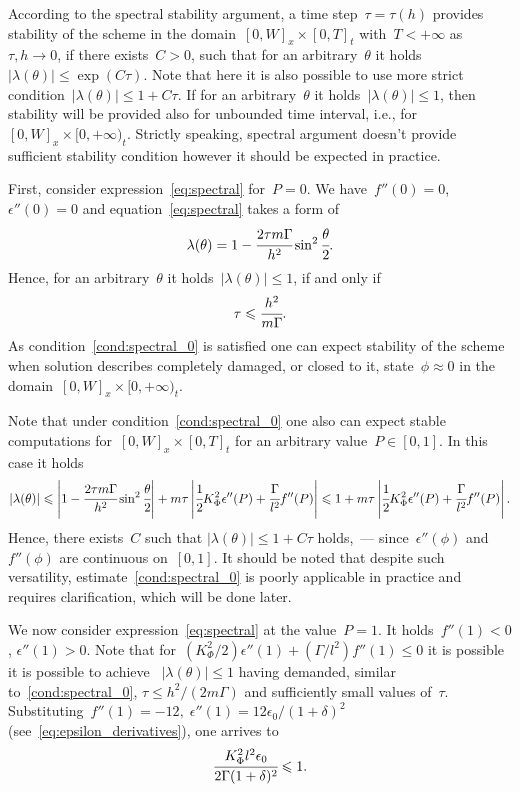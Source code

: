 According to the spectral stability argument, a time
step~$\tau = \tau(h)$ provides stability of the scheme in the
domain~$[0, W]_x \times [0, T]_t$ with~$T<+\infty$ as~$\tau, h \to 0$, if there
exists~$C > 0$, such that for an arbitrary~$\theta$ it
holds~$|\lambda(\theta)| \leqslant \exp(C\tau)$.  Note that here it is
also possible to use more strict condition~$|\lambda(\theta)| \leqslant 1 + C\tau$.
If for an arbitrary~$\theta$ it holds~$|\lambda(\theta)| \leqslant 1$,
then stability will be provided also for unbounded time interval, i.e.,
for~$[0, W]_x \times [0, +\infty)_t$.
Strictly speaking, spectral argument doesn't provide sufficient
stability condition however it should be expected in practice.

First, consider expression~\eqref{eq:spectral} for~$P=0$.
We have~$f''(0) = 0$, $\epsilon''(0) = 0$ and equation~\eqref{eq:spectral}
takes a form of
$$\lambda(\theta) = 1 - \cfrac{2 \tau m \Gamma}{h^2} \sin^2 \cfrac{\theta}{2} {\text{.}}$$
Hence, for an arbitrary~$\theta$ it holds~$|\lambda(\theta)| \leqslant 1$,
if and only if
\begin{equation}
  \tau \leqslant \cfrac{h^2}{m \Gamma} {\text{.}}
  \label{cond:spectral_0}
\end{equation}
As condition~\eqref{cond:spectral_0} is satisfied one can expect stability of the scheme
when solution describes completely damaged, or closed to it, state~$\phi\approx0$
in the domain~$[0, W]_x \times [0, +\infty)_t$.

Note that under condition~\eqref{cond:spectral_0} one also can expect stable computations
for~$[0, W]_x \times [0, T]_t$ for an arbitrary value~$P \in [0, 1]$.
In this case it holds
$$
|\lambda(\theta)| \leqslant \left| 1 - \cfrac{2 \tau m \Gamma}{h^2} \sin^2 \cfrac{\theta}{2} \right| + m \tau \left| \cfrac{1}{2} K_\Phi^2 \epsilon''(P) + \cfrac{\Gamma}{l^2} f''(P) \right| \leqslant 1 + m \tau \left| \cfrac{1}{2} K_\Phi^2 \epsilon''(P) + \cfrac{\Gamma}{l^2} f''(P) \right| {\text{.}}
$$
Hence, there exists~$C$ such that
$|\lambda(\theta)| \leqslant 1 + C \tau$ holds,~--- since~$\epsilon''(\phi)$ and~$f''(\phi)$
are continuous on~$[0, 1]$.
It should be noted that despite such versatility, estimate~\eqref{cond:spectral_0}
is poorly applicable in practice and requires clarification, which will be done later.

We now consider expression~\eqref{eq:spectral} at the value~$P=1$.
It holds~$f''(1) < 0$, $\epsilon''(1) > 0$.
Note that for~$(K_\Phi^2 / 2) \epsilon''(1) + (\Gamma / l^2) f''(1) \leqslant 0$
it is possible it is possible to achieve~ $|\lambda(\theta)| \leqslant 1$
having demanded, similar to~\eqref{cond:spectral_0}, $\tau \leqslant h^2 / (2m \Gamma)$
and sufficiently small values of~$\tau$.
Substituting~$f''(1) = -12, \; \epsilon''(1) = 12 \epsilon_0 / (1 + \delta)^2$ (see~\eqref{eq:epsilon_derivatives}),
one arrives to
\begin{equation}
  \cfrac{K_\Phi^2 l^2 \epsilon_0}{2 \Gamma (1 + \delta)^2} \leqslant 1 {\text{.}}
  \label{cond:spectral_possible_1}
\end{equation}

